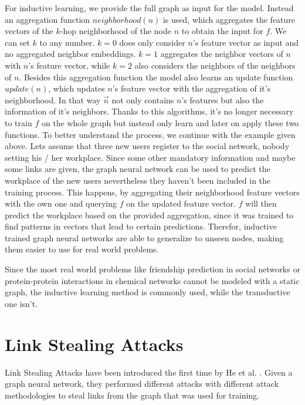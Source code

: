       For inductive learning, we provide the full graph as input for the model.
      Instead an aggregation function $neighborhood(n)$ is used, which aggregates the feature vectors of the $k$-hop neighborhood of the node $n$ to obtain the input for $f$. 
      We can set $k$ to any number.
      $k = 0$ does only consider $n$'s feature vector as input and no aggregated neighbor embeddings.
      $k = 1$ aggregates the neighbor vectors of $n$ with $n$'s feature vector, while $k = 2$ also considers the neighbors of the neighbors of $n$.
      Besides this aggregation function the model also learns an update function $update(n)$, which updates $n$'s feature vector with the aggregation of it's neighborhood.
      In that way $\overrightarrow{n}$ not only contains $n$'s features but also the information of it's neighbors.
      Thanks to this algorithms, it's no longer necessary to train $f$ on the whole graph but instead only learn and later on apply these two functions.
      To better understand the process, we continue with the example given above.
      Lets assume that three new users register to the social network, nobody setting his / her workplace.
      Since some other mandatory information and maybe some links are given, the graph neural network can be used to predict the workplace of the new users nevertheless they haven't been included in the training process.
      This happens, by aggregating their neighborhood feature vectors with the own one and querying $f$ on the updated feature vector.
      $f$ will then predict the workplace based on the provided aggregation, since it was trained to find patterns in vectors that lead to certain predictions.
      Therefor, inductive trained graph neural networks are able to generalize to unseen nodes, making them easier to use for real world problems.
      
      Since the most real world problems like friendship prediction in social networks or protein-protein interactions in chemical networks cannot be modeled with a static graph, the inductive learning method is commonly used, while the transductive one isn't.
      
  \section{Link Stealing Attacks}
    
    Link Stealing Attacks have been introduced the first time by He et al. \cite{DBLP:journals/corr/abs-2005-02131}.
    Given a graph neural network, they performed different attacks with different attack methodologies to steal links from the graph that was used for training.

